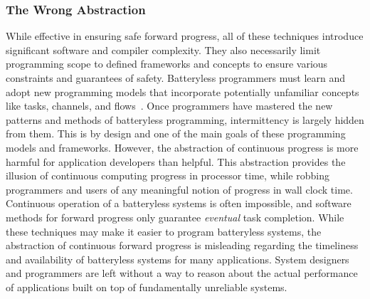 \subsubsection{The Wrong Abstraction}
While effective in ensuring safe forward progress, all of these techniques introduce 
significant software and compiler complexity. 
They also necessarily limit programming scope to defined frameworks and concepts to ensure various constraints and guarantees of safety. 
Batteryless programmers must learn and adopt new programming models that incorporate potentially unfamiliar concepts like tasks, channels, and flows~\cite{colin2016chain,maeng2017alpaca,hesterTimely17}.
Once programmers have mastered the new patterns and methods of batteryless programming, intermittency is largely hidden from them.
This is by design and one of the main goals of these programming models and frameworks. 
However, the abstraction of continuous progress is more harmful for application developers than helpful. 
This abstraction provides the illusion of continuous computing progress in processor time, while robbing programmers and users of any meaningful notion of progress in wall clock time.
Continuous operation of a batteryless systems is often impossible, and software methods for forward progress only guarantee \textit{eventual} task completion.
While these techniques may make it easier to program batteryless systems, 
the abstraction of continuous forward progress is misleading regarding the timeliness and availability of batteryless systems for many applications.
System designers and programmers are left without a way to reason about the actual performance of applications built on top of fundamentally unreliable systems.

